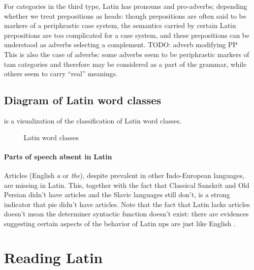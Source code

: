 \documentclass[a4paper, oneside, 12pt]{report}
\newcommand{\form}[1]{\emph{#1}}
\begin{document}
For categories in the third type,
Latin has pronouns and pro-adverbs; 
depending whether we treat prepositions as heads:
though prepositions are often said to be markers of a periphrastic case system,
the semantics carried by certain Latin prepositions are too complicated for a case system,
and these prepositions can be understood as adverbs selecting a complement.
TODO: adverb modifying PP  
This is also the case of adverbs:
some adverbs seem to be periphrastic markers of \acs{tam} categories
and therefore may be considered as a part of the grammar,
while others seem to carry ``real'' meanings.

\subsection{Diagram of Latin word classes} 
 is a visualization of the classification of Latin word classes.

\begin{sidewaysfigure}
    \centering
    \small
    
    \caption{Latin word classes}
    \label{fig:latin-word-class}
\end{sidewaysfigure}

\paragraph*{Parts of speech absent in Latin} 
Articles (English \form{a} or \form{the}), 
despite prevalent in other Indo-European languages,
are missing in Latin.
This, together with the fact that Classical Sanskrit and Old Persian didn't have articles 
and the Slavic languages still don't,
is a strong indicator that \ac{pie} didn't have articles. 
Note that the fact that Latin lacks articles 
doesn't mean the determiner syntactic function doesn't exist:
there are evidences suggesting certain aspects of the behavior of Latin \acs{np}s 
are just like English \citep{giusti2014split}.

\section{Reading Latin}\label{sec:grammatical.parse}
\end{document}
